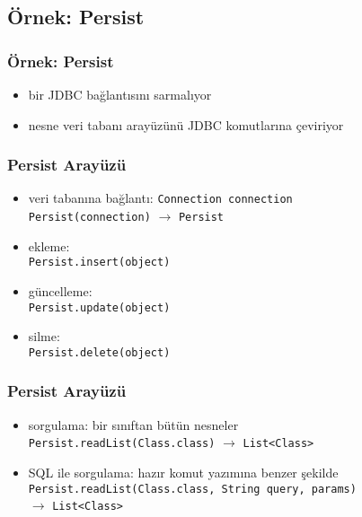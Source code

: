 \documentclass[dvipsnames]{beamer}
\theoremstyle{definition}
\theoremstyle{example}
\theoremstyle{plain}
\begin{document}
\subsection{Örnek: Persist}

\begin{frame}
  \frametitle{Örnek: Persist}

  \begin{itemize}
    \item bir JDBC bağlantısını sarmalıyor
    \item nesne veri tabanı arayüzünü JDBC komutlarına çeviriyor
  \end{itemize}
\end{frame}

\begin{frame}
  \frametitle{Persist Arayüzü}

  \begin{itemize}
    \item veri tabanına bağlantı: \lstinline!Connection connection!\\
      \lstinline!Persist(connection)! $\rightarrow$ \lstinline!Persist!

    \pause
    \medskip
    \item ekleme:\\
      \lstinline!Persist.insert(object)!
    \item güncelleme:\\
      \lstinline!Persist.update(object)!
    \item silme:\\
      \lstinline!Persist.delete(object)!
  \end{itemize}
\end{frame}

\begin{frame}
  \frametitle{Persist Arayüzü}

  \begin{itemize}
    \item sorgulama: bir sınıftan bütün nesneler\\
      \lstinline!Persist.readList(Class.class)!
       $\rightarrow$ \lstinline!List<Class>!
    \item SQL ile sorgulama: hazır komut yazımına benzer şekilde\\
      \lstinline!Persist.readList(Class.class, String query, params)!\\
       $\rightarrow$ \lstinline!List<Class>!
  \end{itemize}
\end{frame}
\end{document}
